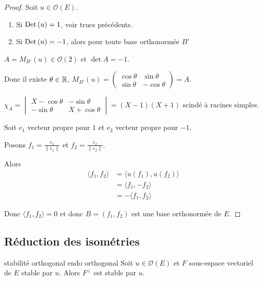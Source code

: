 \begin{proof}
    Soit $u \in \mathcal O(E)$. 
    \begin{enumerate}
        \item Si $\operatorname{Det} \,(u) = 1$, voir trucs précédents. 
        \item Si $\operatorname{Det} \,(u) = -1$, alors pour toute base orthonormée $B'$
    \end{enumerate}

    $A = M_{B'}(u) \in \mathcal O(2)$ et $\det A = -1$.

    Donc il existe $\theta \in \mathbb{R}$, $M_{B'}(u) = \begin{pmatrix}
        \cos \theta & \sin \theta \\
        \sin \theta & -\cos \theta
    \end{pmatrix} = A$. 

    $\chi_A = \begin{vmatrix}
        X - \cos \theta & -\sin \theta \\
        -\sin \theta & X + \cos \theta
    \end{vmatrix} = (X- 1)(X + 1)$ scindé à racines simples. 

    Soit $e_1$ vecteur propre pour $1$ et $e_2$ vecteur propre pour $-1$.

    Posons $f_1 = \frac{e_1}{\| e_1 \|}$ et $f_2 = \frac{e_2}{\| e_2 \|}$. 

    Alors 
    \begin{align}
        \langle f_1, f_2 \rangle & = \langle u (f_1), u (f_2) \rangle \\
        & = \langle f_1, - f_2 \rangle \\
        & = - \langle f_1, f_2 \rangle
    \end{align}

    Donc $\langle f_1, f_2 \rangle = 0$ et donc $B = (f_1, f_2)$ est une base orthonormée de $E$.
\end{proof}

\subsection{Réduction des isométries }

\begin{proposition}{stabilité orthogonal endo orthogonal}{}
    Soit $u \in \mathcal O(E)$ et $F$ sous-espace vectoriel de $E$ stable par $u$. Alors 
    $F^\perp$ est stable par $u$. 
\end{proposition}


